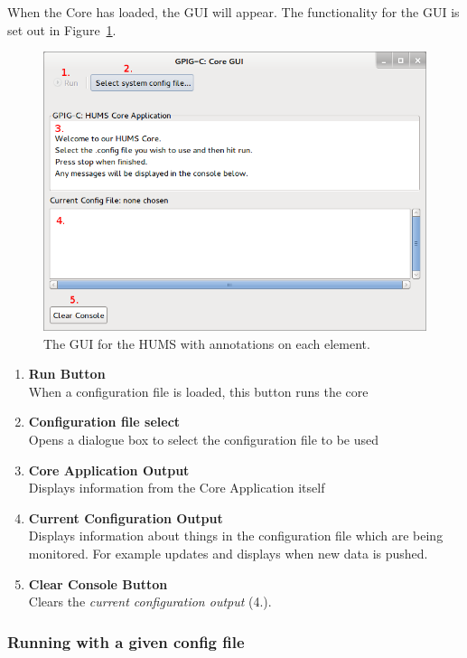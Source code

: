 \documentclass[10pt,a4paper]{article}
\begin{document}
When the Core has loaded, the GUI will appear. The functionality for the GUI is set out in Figure~\ref{fig:manualgui}.
\begin{figure}[H]
  \centering
  \includegraphics[width=\textwidth]{images/manual-gui.png}
  \caption{The GUI for the HUMS with annotations on each element.}
  \label{fig:manualgui}
\end{figure}
\begin{enumerate}
\item \textbf{Run Button} \\ 
When a configuration file is loaded, this button runs the core
\item \textbf{Configuration file select} \\ 
Opens a dialogue box to select the configuration file to be used
\item \textbf{Core Application Output} \\ 
Displays information from the Core Application itself
\item \textbf{Current Configuration Output} \\ 
Displays information about things in the configuration file which are being monitored. For example updates and displays when new data is pushed.
\item \textbf{Clear Console Button} \\ 
Clears the \emph{current configuration output} (4.).
\end{enumerate}

\subsubsection{Running with a given config file}
\label{subsec:loadconf}
\end{document}
